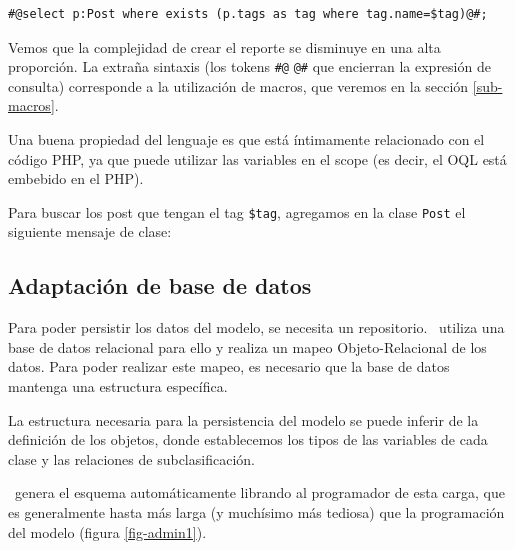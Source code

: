 \begin{verbatim}
#@select p:Post where exists (p.tags as tag where tag.name=$tag)@#;
\end{verbatim}

Vemos que la complejidad de crear el reporte se disminuye en una alta proporción.
La extraña sintaxis (los tokens \verb"#@" \verb"@#" que encierran la expresión de consulta) corresponde a la utilización de macros, que veremos en la sección \ref{sub-macros}.

Una buena propiedad del lenguaje es que está íntimamente relacionado con el código PHP, ya que puede utilizar las variables en el scope (es decir, el OQL está embebido en el PHP).

Para buscar los post que tengan el tag  \verb"$tag", %
agregamos en la clase \verb"Post" el siguiente mensaje de clase:


\subsection{Adaptación de base de datos}
\label{sub-adapt}

Para poder persistir los datos del modelo, se necesita un repositorio. \PWB\ utiliza una base de datos relacional para ello y realiza un mapeo Objeto-Relacional de los datos. Para poder realizar este mapeo, es necesario que la base de datos mantenga una estructura específica.

La estructura necesaria para la persistencia del modelo se puede inferir de la definición de los objetos, donde establecemos los tipos de las variables de cada clase y las relaciones de subclasificación.

\PWB \ genera el esquema automáticamente librando al programador de esta carga, que es generalmente hasta más larga (y muchísimo más tediosa) que la programación del modelo (figura \ref{fig-admin1}).

